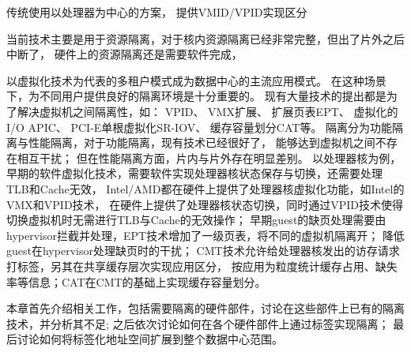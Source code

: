 
\iffalse

传统使用以处理器为中心的方案，
提供VMID/VPID实现区分


当前技术主要是用于资源隔离，对于核内资源隔离已经非常完整，但出了片外之后中断了，
硬件上的资源隔离还是需要软件完成，


以虚拟化技术为代表的多租户模式成为数据中心的主流应用模式。
在这种场景下，为不同用户提供良好的隔离环境是十分重要的。
现有大量技术的提出都是为了解决虚拟机之间隔离性，如：
VPID、
VMX扩展、
扩展页表EPT、
虚拟化的I/O APIC、
PCI-E单根虚拟化SR-IOV、
缓存容量划分CAT等。
隔离分为功能隔离与性能隔离，对于功能隔离，现有技术已经很好了，
能够达到虚拟机之间不存在相互干扰；
但在性能隔离方面，片内与片外存在明显差别。
以处理器核为例，
早期的软件虚拟化技术，需要软件实现处理器核状态保存与切换，还需要处理TLB和Cache无效，
Intel/AMD都在硬件上提供了处理器核虚拟化功能，如Intel的VMX和VPID技术，
在硬件上提供了处理器核状态切换，同时通过VPID技术使得切换虚拟机时无需进行TLB与Cache的无效操作；
早期guest的缺页处理需要由hypervisor拦截并处理，EPT技术增加了一级页表，将不同的虚拟机隔离开；
降低guest在hypervisor处理缺页时的干扰；
CMT技术允许给处理器核发出的访存请求打标签，另其在共享缓存层次实现应用区分，
按应用为粒度统计缓存占用、缺失率等信息；CAT在CMT的基础上实现缓存容量划分。

%
%
%
%
%



本章首先介绍相关工作，包括需要隔离的硬件部件，讨论在这些部件上已有的隔离技术，并分析其不足;
之后依次讨论如何在各个硬件部件上通过标签实现隔离；
最后讨论如何将标签化地址空间扩展到整个数据中心范围。


